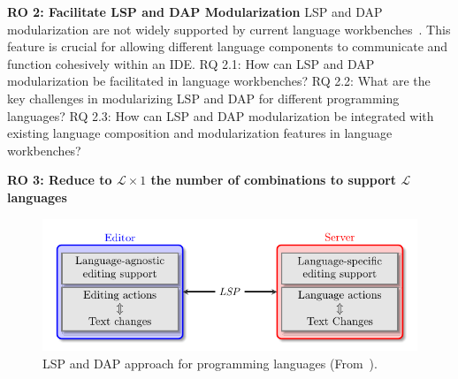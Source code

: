\hfill \break
\noindent
\textbf{RO 2: Facilitate LSP and DAP Modularization}
\hfill \break
LSP and DAP modularization are not widely supported by current language workbenches~\cite{Bunder19a}. This feature is crucial for allowing different language components to communicate and function cohesively within an IDE.
\hfill \break
\textsf{RQ 2.1}: How can LSP and DAP modularization be facilitated in language workbenches?
\hfill \break
\textsf{RQ 2.2}: What are the key challenges in modularizing LSP and DAP for different programming languages?
\hfill \break
\textsf{RQ 2.3}: How can LSP and DAP modularization be integrated with existing language composition and modularization features in language workbenches?

\hfill \break
\noindent
\textbf{RO 3: Reduce to $\mathcal{L} \times 1$ the number of combinations to support $\mathcal{L}$ languages}

\begin{figure}[t]
    \centering
    \includegraphics[width=0.75\linewidth]{figs/lsp_agnostic.pdf}
    \caption{LSP and DAP approach for programming languages (From~\cite{Rodriguez-Echeverria18a}).}
    \label{fig:agnostic}
\end{figure}

